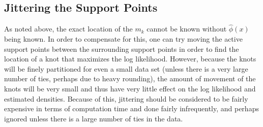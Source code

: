 	{\subsection{Jittering the Support Points} } 
	
	As noted above, the exact location of the $m_k$ cannot be known without $\hat\phi(x)$ being known. In order to compensate for this, one can try moving the active support points between the surrounding support points in order to find the location of a knot that maximizes the log likelihood. However, because the knots will be finely partitioned for even a small data set (unless there is a very large number of ties, perhaps due to heavy rounding), the amount of movement of the knots will be very small and thus have very little effect on the log likelihood and estimated densities. Because of this, jittering should be considered to be fairly expensive in terms of computation time and done fairly infrequently, and perhaps ignored unless there is a large number of ties in the data.
